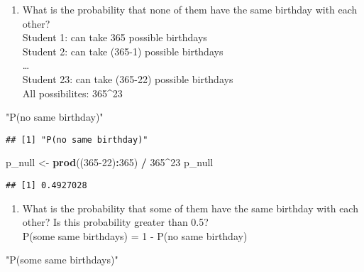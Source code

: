 \documentclass[]{article}
\newenvironment{Shaded}{\begin{snugshade}}{\end{snugshade}}
\newcommand{\DecValTok}[1]{\textcolor[rgb]{0.00,0.00,0.81}{#1}}
\newcommand{\KeywordTok}[1]{\textcolor[rgb]{0.13,0.29,0.53}{\textbf{#1}}}
\newcommand{\NormalTok}[1]{#1}
\newcommand{\OperatorTok}[1]{\textcolor[rgb]{0.81,0.36,0.00}{\textbf{#1}}}
\newcommand{\StringTok}[1]{\textcolor[rgb]{0.31,0.60,0.02}{#1}}
\providecommand{\tightlist}{%
  \setlength{\itemsep}{0pt}\setlength{\parskip}{0pt}}
\begin{document}
\begin{enumerate}
\def\labelenumi{\roman{enumi}.}
\tightlist
\item
  What is the probability that none of them have the same birthday with
  each other?\\
  Student 1: can take 365 possible birthdays\\
  Student 2: can take (365-1) possible birthdays\\
  \ldots{}\\
  Student 23: can take (365-22) possible birthdays\\
  All possibilites: 365\^{}23
\end{enumerate}

\begin{Shaded}
\begin{Highlighting}[]
\StringTok{"P(no same birthday)"}
\end{Highlighting}
\end{Shaded}

\begin{verbatim}
## [1] "P(no same birthday)"
\end{verbatim}

\begin{Shaded}
\begin{Highlighting}[]
\NormalTok{p_null <-}\StringTok{ }\KeywordTok{prod}\NormalTok{((}\DecValTok{365-22}\NormalTok{)}\OperatorTok{:}\DecValTok{365}\NormalTok{) }\OperatorTok{/}\StringTok{ }\DecValTok{365}\OperatorTok{^}\DecValTok{23}
\NormalTok{p_null}
\end{Highlighting}
\end{Shaded}

\begin{verbatim}
## [1] 0.4927028
\end{verbatim}

\begin{enumerate}
\def\labelenumi{\roman{enumi}.}
\setcounter{enumi}{1}
\tightlist
\item
  What is the probability that some of them have the same birthday with
  each other? Is this probability greater than 0.5?\\
  P(some same birthdays) = 1 - P(no same birthday)
\end{enumerate}

\begin{Shaded}
\begin{Highlighting}[]
\StringTok{"P(some same birthdays)"}
\end{Highlighting}
\end{Shaded}
\end{document}
